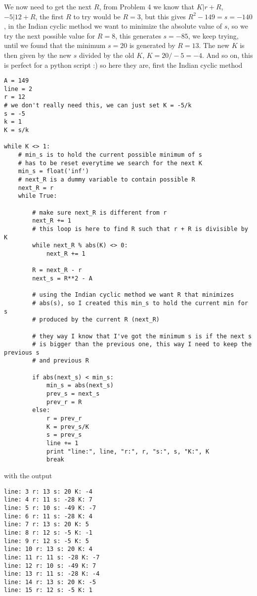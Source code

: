 \documentclass[aps,preprint,preprintnumbers,nofootinbib,showpacs,prd]{revtex4-1}
\begin{document}
We now need to get the next $R$, from Problem 4 we know that $K|r+R$, $-5|12 + R$, the first $R$ to try would be $R=3$, but this gives $R^2 - 149 = s = -140$, in the Indian cyclic method we want to minimize the absolute value of $s$, so we try the next possible value for $R = 8$, this generates $s = -85$, we keep trying, until we found that the minimum $s = 20$ is generated by $R = 13$. The new $K$ is then given by the new $s$ divided by the old $K$, $K = 20/-5 = -4$. And so on, this is perfect for a python script :) so here they are, first the Indian cyclic method
%
\begin{Verbatim}[baselinestretch=0.75]
A = 149
line = 2
r = 12
# we don't really need this, we can just set K = -5/k
s = -5
k = 1
K = s/k

while K <> 1:
    # min_s is to hold the current possible minimum of s
    # has to be reset everytime we search for the next K
    min_s = float('inf')
    # next_R is a dummy variable to contain possible R
    next_R = r
    while True:

        # make sure next_R is different from r
        next_R += 1
        # this loop is here to find R such that r + R is divisible by K
        while next_R % abs(K) <> 0:
            next_R += 1

        R = next_R - r
        next_s = R**2 - A

        # using the Indian cyclic method we want R that minimizes
        # abs(s), so I created this min_s to hold the current min for s
        # produced by the current R (next_R)

        # they way I know that I've got the minimum s is if the next s
        # is bigger than the previous one, this way I need to keep the previous s
        # and previous R

        if abs(next_s) < min_s:
            min_s = abs(next_s)
            prev_s = next_s
            prev_r = R
        else:
            r = prev_r
            K = prev_s/K
            s = prev_s
            line += 1
            print "line:", line, "r:", r, "s:", s, "K:", K
            break
\end{Verbatim}
%
with the output
%
\begin{Verbatim}[baselinestretch=0.75]
line: 3 r: 13 s: 20 K: -4
line: 4 r: 11 s: -28 K: 7
line: 5 r: 10 s: -49 K: -7
line: 6 r: 11 s: -28 K: 4
line: 7 r: 13 s: 20 K: 5
line: 8 r: 12 s: -5 K: -1
line: 9 r: 12 s: -5 K: 5
line: 10 r: 13 s: 20 K: 4
line: 11 r: 11 s: -28 K: -7
line: 12 r: 10 s: -49 K: 7
line: 13 r: 11 s: -28 K: -4
line: 14 r: 13 s: 20 K: -5
line: 15 r: 12 s: -5 K: 1
\end{Verbatim}
\end{document}
